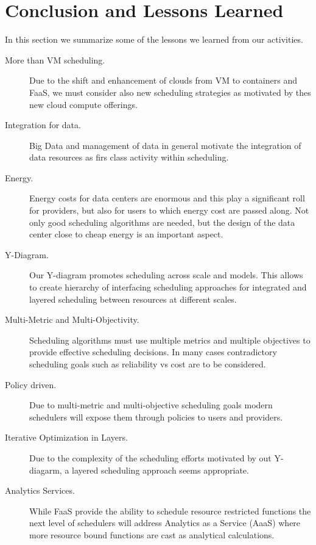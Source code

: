 \documentclass[final,5p,times,twocolumn]{elsarticle}
\begin{document}
\section{Conclusion and Lessons Learned}\label{sec:conclusion}



In this section we summarize some of the lessons we learned from our activities.

\begin{description}

\item[More than VM scheduling.] Due to the shift and enhancement of
clouds from VM to containers and FaaS, we must consider also new
scheduling strategies as motivated by thes new cloud compute
offerings.

\item[Integration for data.] Big Data and management of data in
general motivate the integration of data resources as firs class
activity within scheduling.

\item[Energy.] Energy costs for data centers are enormous and this
play a significant roll for providers, but also for users to which
energy cost are passed along. Not only good scheduling algorithms are
needed, but the design of the data center close to cheap energy is an
important aspect.

\item[Y-Diagram.] Our Y-diagram promotes scheduling across scale and
models. This allows to create hierarchy of interfacing scheduling
approaches for integrated and layered scheduling between resources at
different scales.

\item[Multi-Metric and Multi-Objectivity.] Scheduling algorithms must
use multiple metrics and multiple objectives to provide effective
scheduling decisions. In many cases contradictory scheduling goals
such as reliability vs cost are to be considered.

\item[Policy driven.] Due to multi-metric and multi-objective
scheduling goals modern schedulers will expose them through policies
to users and providers.


\item[Iterative Optimization in Layers.] Due to the complexity of the
scheduling efforts motivated by out Y-diagarm, a layered scheduling
approach seems appropriate.

\item[Analytics Services.] While FaaS provide the ability to schedule
resource restricted functions the next level of schedulers will
address Analytics as a Service (AaaS) where more resource bound
functions are cast as analytical calculations.


\end{description}
\end{document}
